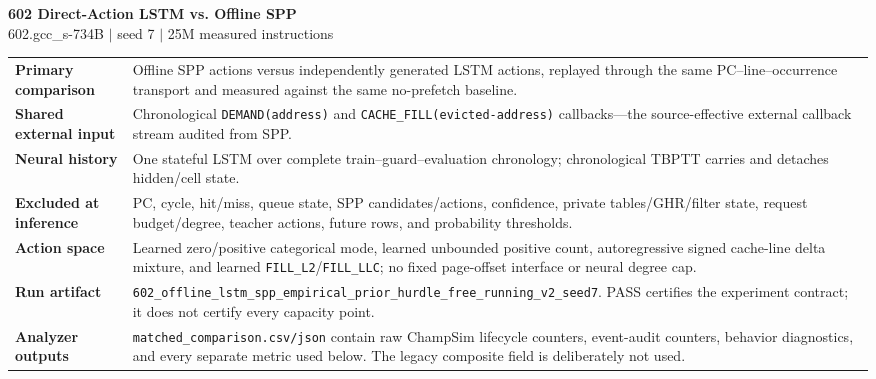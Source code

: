 \documentclass[10pt]{article}
\begin{document}
\begin{center}
{\LARGE\bfseries\color{navy} 602 Direct-Action LSTM vs. Offline SPP}\\[2pt]
{\small 602.gcc\_s-734B \quad $\vert$ \quad seed 7 \quad $\vert$ \quad 25M measured instructions}\\[4pt]
\quad
{}
\end{center}

\begin{infobox}
\begin{tabularx}{\textwidth}{@{}>{\bfseries}lX@{}}
Primary comparison & Offline SPP actions versus independently generated LSTM actions, replayed through the same PC--line--occurrence transport and measured against the same no-prefetch baseline.\\
Shared external input & Chronological \texttt{DEMAND(address)} and \texttt{CACHE\_FILL(evicted-address)} callbacks---the source-effective external callback stream audited from SPP.\\
Neural history & One stateful LSTM over complete train--guard--evaluation chronology; chronological TBPTT carries and detaches hidden/cell state.\\
Excluded at inference & PC, cycle, hit/miss, queue state, SPP candidates/actions, confidence, private tables/GHR/filter state, request budget/degree, teacher actions, future rows, and probability thresholds.\\
Action space & Learned zero/positive categorical mode, learned unbounded positive count, autoregressive signed cache-line delta mixture, and learned \texttt{FILL\_L2}/\texttt{FILL\_LLC}; no fixed page-offset interface or neural degree cap.\\
Run artifact & \texttt{602\_offline\_lstm\_spp\_empirical\_prior\_hurdle\_free\_running\_v2\_seed7}. PASS certifies the experiment contract; it does not certify every capacity point.\\
Analyzer outputs & \texttt{matched\_comparison.csv/json} contain raw ChampSim lifecycle counters, event-audit counters, behavior diagnostics, and every separate metric used below. The legacy composite field is deliberately not used.\\
\end{tabularx}
\end{infobox}
\end{document}
